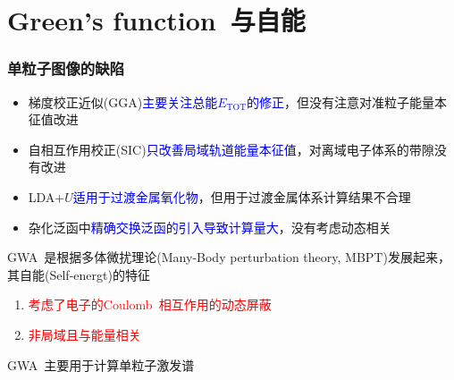 \documentclass[cjk,slidestop,compress,mathserif,blue]{beamer}
\begin{document}
\section{\rm{Green's function~}与自能}
\frame
{
	\frametitle{单粒子图像的缺陷}
	\begin{itemize}
		\item 梯度校正近似(\textrm{GGA})\textcolor{blue}{主要关注总能$E_{\mathrm{TOT}}$的修正}，但没有注意对准粒子能量本征值改进
		\item 自相互作用校正(\textrm{SIC})\textcolor{blue}{只改善局域轨道能量本征值}，对离域电子体系的带隙没有改进
		\item \textrm{LDA}+$U$\textcolor{blue}{适用于过渡金属氧化物}，但用于过渡金属体系计算结果不合理
		\item 杂化泛函中\textcolor{blue}{精确交换泛函的引入导致计算量大}，没有考虑动态相关
	\end{itemize}
	\textrm{GWA~}是根据多体微扰理论(\textrm{Many-Body perturbation theory, MBPT})发展起来，其自能(\textrm{Self-energt})的特征
	\begin{enumerate}
		\item \textcolor{red}{考虑了电子的\textrm{Coulomb~}相互作用的动态屏蔽}
		\item \textcolor{red}{非局域且与能量相关}
	\end{enumerate}
	\textrm{GWA~}主要用于计算单粒子激发谱
}
\frame
\end{document}

